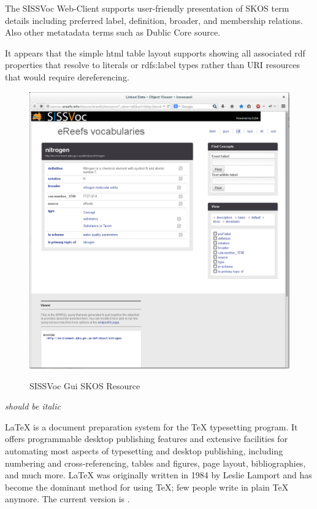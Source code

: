 \documentclass[10pt,a4paper]{article}
\begin{document}
\begin{flushleft}
The SISSVoc Web-Client supports user-friendly presentation of SKOS term details
including preferred label, definition, broader, and membership relations. Also
other metatadata terms such as Dublic Core source. 

It appears that the simple html table layout supports showing all associated rdf
properties that resolve to literals or rdfs:label types rather than URI
resources that would require dereferencing.

\begin{figure}[H]
\centering
\caption{SISSVoc Gui SKOS Resource }
\includegraphics[width=12cm]{nitrogen}  
\label{fig:test}
\end{figure}






  \end{flushleft}


  \textit{should be italic}


\LaTeX{} is a document preparation system for the \TeX{}
  typesetting program. It offers programmable desktop
  publishing features and extensive facilities for
  automating most aspects of typesetting and desktop
  publishing, including numbering and cross-referencing,
  tables and figures, page layout, bibliographies, and
  much more. \LaTeX{} was originally written in 1984 by
  Leslie Lamport and has become the dominant method for
  using \TeX; few people write in plain \TeX{} anymore.
  The current version is \LaTeXe.
\end{document}
